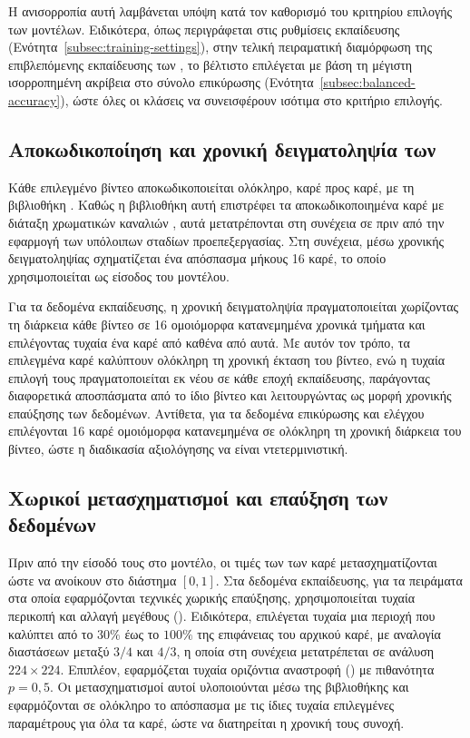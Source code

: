 Η ανισορροπία αυτή λαμβάνεται υπόψη κατά τον καθορισμό του κριτηρίου
επιλογής των μοντέλων. Ειδικότερα, όπως περιγράφεται στις ρυθμίσεις
εκπαίδευσης (Ενότητα~\ref{subsec:training-settings}), στην τελική
πειραματική διαμόρφωση της επιβλεπόμενης εκπαίδευσης των
, το βέλτιστο  επιλέγεται με
βάση τη μέγιστη ισορροπημένη ακρίβεια στο σύνολο επικύρωσης
(Ενότητα~\ref{subsec:balanced-accuracy}), ώστε όλες οι κλάσεις να
συνεισφέρουν ισότιμα στο κριτήριο επιλογής.


\subsection{Αποκωδικοποίηση και χρονική δειγματοληψία των }
\label{subsec:frame-decoding-sampling}

Κάθε επιλεγμένο βίντεο αποκωδικοποιείται ολόκληρο, καρέ προς καρέ, με
τη βιβλιοθήκη \cite{bradski2000opencv}. Καθώς η βιβλιοθήκη αυτή επιστρέφει τα αποκωδικοποιημένα καρέ με
διάταξη χρωματικών καναλιών , αυτά μετατρέπονται στη συνέχεια σε
 πριν από την εφαρμογή των υπόλοιπων σταδίων προεπεξεργασίας. Στη συνέχεια, μέσω χρονικής δειγματοληψίας
σχηματίζεται ένα απόσπασμα μήκους 16 καρέ, το οποίο χρησιμοποιείται ως
είσοδος του μοντέλου.

Για τα δεδομένα εκπαίδευσης, η χρονική δειγματοληψία πραγματοποιείται
χωρίζοντας τη διάρκεια κάθε βίντεο σε 16 ομοιόμορφα κατανεμημένα χρονικά
τμήματα και επιλέγοντας τυχαία ένα καρέ από καθένα από αυτά. Με αυτόν τον τρόπο, τα επιλεγμένα καρέ καλύπτουν ολόκληρη τη χρονική
έκταση του βίντεο, ενώ η τυχαία επιλογή τους πραγματοποιείται εκ νέου σε
κάθε εποχή εκπαίδευσης, παράγοντας διαφορετικά αποσπάσματα από το ίδιο
βίντεο και λειτουργώντας ως μορφή χρονικής επαύξησης των δεδομένων. Αντίθετα, για τα δεδομένα επικύρωσης και ελέγχου
επιλέγονται 16 καρέ ομοιόμορφα κατανεμημένα σε ολόκληρη τη χρονική
διάρκεια του βίντεο, ώστε η διαδικασία αξιολόγησης να είναι
ντετερμινιστική.


\subsection{Χωρικοί μετασχηματισμοί και επαύξηση των δεδομένων}
\label{subsec:transform-data-augmentations}

Πριν από την είσοδό τους στο μοντέλο, οι τιμές των  των καρέ
μετασχηματίζονται ώστε να ανοίκουν στο διάστημα \([0,1]\). Στα δεδομένα εκπαίδευσης, για τα
πειράματα στα οποία εφαρμόζονται τεχνικές χωρικής επαύξησης,
χρησιμοποιείται τυχαία περικοπή και αλλαγή μεγέθους
(). Ειδικότερα, επιλέγεται τυχαία μια περιοχή
που καλύπτει από το \(30\%\) έως το \(100\%\) της επιφάνειας του αρχικού
καρέ, με αναλογία διαστάσεων μεταξύ \(3/4\) και \(4/3\), η οποία στη
συνέχεια μετατρέπεται σε ανάλυση \(224\times224\). Επιπλέον, εφαρμόζεται
τυχαία οριζόντια αναστροφή () με πιθανότητα
\(p=0{,}5\). Οι μετασχηματισμοί αυτοί υλοποιούνται μέσω της βιβλιοθήκης
 και εφαρμόζονται σε ολόκληρο το απόσπασμα με τις ίδιες
τυχαία επιλεγμένες παραμέτρους για όλα τα καρέ, ώστε να διατηρείται η
χρονική τους συνοχή.

